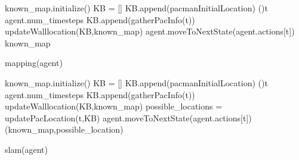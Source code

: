 \begin{algorithm}
    known\_map.initialize()\;
    KB = []\;
    KB.append(pacmanInitialLocation)\;
    \For(){t \in agent.num\_timesteps}
    {
        KB.append(gatherPacInfo(t))\;
        updateWalllocation(KB,known\_map)\;
        agent.moveToNextState(agent.actions[t])\;
        \yield known\_map\;
    }
    \caption{mapping(agent)}
\end{algorithm}

\begin{algorithm}
    known\_map.initialize()\;
    KB = []\;
    KB.append(pacmanInitialLocation)\;
    \For(){t \in agent.num\_timesteps}
    {
        KB.append(gatherPacInfo(t))\;
        updateWalllocation(KB,known\_map)\;
        possible\_locations = updatePacLocation(t,KB)\;
        agent.moveToNextState(agent.actions[t])\;
        \yield (known\_map,possible\_location)\;
    }
    \caption{slam(agent)}
\end{algorithm}
